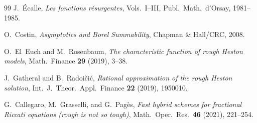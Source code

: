 \documentclass[11pt]{article}
\theoremstyle{definition}
\theoremstyle{remark}
\begin{document}
\begin{thebibliography}{99}
J.~\'Ecalle, \emph{Les fonctions r\'esurgentes}, Vols.~I--III, Publ.\ Math.\ d'Orsay, 1981--1985.

O.~Costin, \emph{Asymptotics and Borel Summability}, Chapman \& Hall/CRC, 2008.

O.~El~Euch and M.~Rosenbaum, \emph{The characteristic function of rough Heston models}, Math.\ Finance \textbf{29} (2019), 3--38.

J.~Gatheral and B.~Radoi\v{c}i\'c, \emph{Rational approximation of the rough Heston solution}, Int.\ J.~Theor.\ Appl.\ Finance \textbf{22} (2019), 1950010.

G.~Callegaro, M.~Grasselli, and G.~Pag\`es, \emph{Fast hybrid schemes for fractional Riccati equations (rough is not so tough)}, Math.\ Oper.\ Res.\ \textbf{46} (2021), 221--254.

\end{thebibliography}
\end{document}
